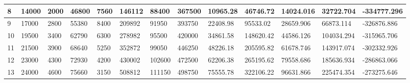 \begin{table}[]
{\begin{tabular}{|l|l|l|l|l|l|l|l|l|l|l|l|l|}
    8     & 14000     & 2000          & 46800                                                 & 7560                                                           & 146112                                                   & 88400                                                      & 367500                                                          & 10965.28  & 46746.72   & 14024.016     & 32722.704        & -334777.296     \\ \hline
    9     & 17000     & 2800          & 55380                                                 & 8400                                                           & 209892                                                   & 91950                                                      & 393750                                                          & 22408.98  & 95533.02   & 28659.906     & 66873.114        & -326876.886     \\ \hline
    10    & 19500     & 3400          & 62790                                                 & 6300                                                           & 278982                                                   & 95500                                                      & 420000                                                          & 34861.58  & 148620.42  & 44586.126     & 104034.294       & -315965.706     \\ \hline
    11    & 21500     & 3900          & 68640                                                 & 5250                                                           & 352872                                                   & 99050                                                      & 446250                                                          & 48226.18  & 205595.82  & 61678.746     & 143917.074       & -302332.926     \\ \hline
    12    & 23000     & 4300          & 72930                                                 & 4200                                                           & 430002                                                   & 102600                                                     & 472500                                                          & 62206.38  & 265195.62  & 79558.686     & 185636.934       & -286863.066     \\ \hline
    13    & 24000     & 4600          & 75660                                                 & 3150                                                           & 508812                                                   & 111150                                                     & 498750                                                          & 75555.78  & 322106.22  & 96631.866     & 225474.354       & -273275.646     \\ \hline

\end{tabular}}
\end{table}
